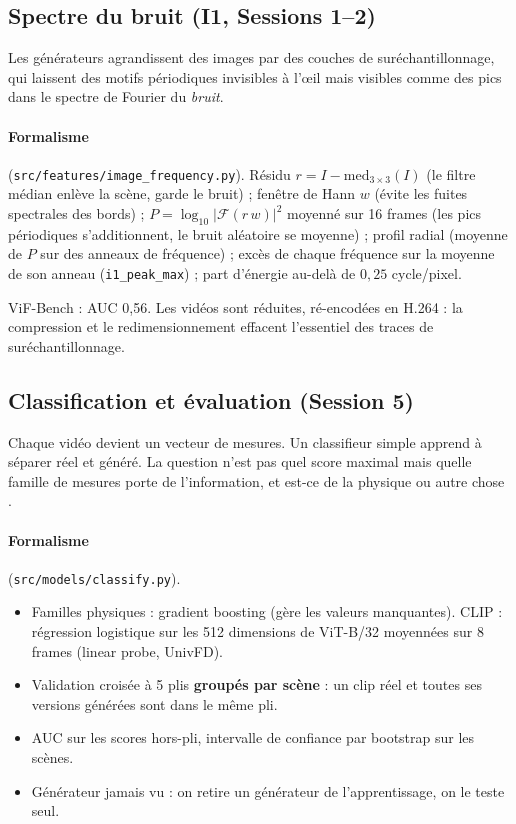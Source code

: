 \documentclass[11pt,a4paper]{article}
\begin{document}
\subsection{Spectre du bruit (I1, Sessions 1--2)}

\begin{intuition}
Les générateurs agrandissent des images par des couches de suréchantillonnage, qui laissent des
motifs périodiques invisibles à l'\oe il mais visibles comme des pics dans le spectre de Fourier du
\emph{bruit}.
\end{intuition}

\paragraph{Formalisme} (\texttt{src/features/image\_frequency.py}).
Résidu $r=I-\mathrm{med}_{3\times3}(I)$ (le filtre médian enlève la scène, garde le bruit) ; fenêtre de
Hann $w$ (évite les fuites spectrales des bords) ; $P=\log_{10}|\mathcal F(r\,w)|^2$ moyenné sur 16
frames (les pics périodiques s'additionnent, le bruit aléatoire se moyenne) ; profil radial (moyenne
de $P$ sur des anneaux de fréquence) ; excès de chaque fréquence sur la moyenne de son anneau
(\texttt{i1\_peak\_max}) ; part d'énergie au-delà de $0{,}25$ cycle/pixel.

\begin{resultat}
ViF-Bench : AUC 0,56. Les vidéos sont réduites, ré-encodées en H.264 : la compression et le
redimensionnement effacent l'essentiel des traces de suréchantillonnage.
\end{resultat}

\subsection{Classification et évaluation (Session 5)}

\begin{intuition}
Chaque vidéo devient un vecteur de mesures. Un classifieur simple apprend à séparer réel et généré.
La question n'est pas \og quel score maximal \fg{} mais \og quelle famille de mesures porte de
l'information, et est-ce de la physique ou autre chose \fg.
\end{intuition}

\paragraph{Formalisme} (\texttt{src/models/classify.py}).
\begin{itemize}
  \item Familles physiques : gradient boosting (gère les valeurs manquantes). CLIP : régression
        logistique sur les 512 dimensions de ViT-B/32 moyennées sur 8 frames (linear probe, UnivFD).
  \item Validation croisée à 5 plis \textbf{groupés par scène} : un clip réel et toutes ses versions
        générées sont dans le même pli.
  \item AUC sur les scores hors-pli, intervalle de confiance par bootstrap sur les scènes.
  \item Générateur jamais vu : on retire un générateur de l'apprentissage, on le teste seul.
\end{itemize}
\end{document}
